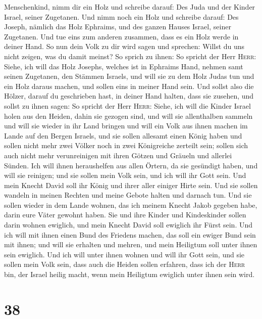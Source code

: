 Menschenkind, nimm dir ein Holz und schreibe darauf: Des Juda und der
Kinder Israel, seiner Zugetanen. Und nimm noch ein Holz und schreibe
darauf: Des Joseph, nämlich das Holz Ephraims, und des ganzen Hauses
Israel, seiner Zugetanen.  Und tue eins zum anderen
zusammen, dass es ein Holz werde in deiner Hand.  So nun
dein Volk zu dir wird sagen und sprechen: Willst du uns nicht zeigen,
was du damit meinst?  So sprich zu ihnen: So spricht der
Herr \textsc{Herr}: Siehe, ich will das Holz Josephs, welches ist in
Ephraims Hand, nehmen samt seinen Zugetanen, den Stämmen Israels, und
will sie zu dem Holz Judas tun und ein Holz daraus machen, und sollen
eins in meiner Hand sein.  Und sollst also die Hölzer,
darauf du geschrieben hast, in deiner Hand halten, dass sie zusehen,
 und sollst zu ihnen sagen: So spricht der Herr
\textsc{Herr}: Siehe, ich will die Kinder Israel holen aus den Heiden,
dahin sie gezogen sind, und will sie allenthalben sammeln und will sie
wieder in ihr Land bringen  und will ein Volk aus ihnen
machen im Lande auf den Bergen Israels, und sie sollen allesamt einen
König haben und sollen nicht mehr zwei Völker noch in zwei Königreiche
zerteilt sein;  sollen sich auch nicht mehr verunreinigen
mit ihren Götzen und Gräueln und allerlei Sünden. Ich will ihnen
heraushelfen aus allen Örtern, da sie gesündigt haben, und will sie
reinigen; und sie sollen mein Volk sein, und ich will ihr Gott sein.
 Und mein Knecht David soll ihr König und ihrer aller
einiger Hirte sein. Und sie sollen wandeln in meinen Rechten und meine
Gebote halten und darnach tun.  Und sie sollen wieder in
dem Lande wohnen, das ich meinem Knecht Jakob gegeben habe, darin eure
Väter gewohnt haben. Sie und ihre Kinder und Kindeskinder sollen darin
wohnen ewiglich, und mein Knecht David soll ewiglich ihr Fürst sein.
 Und ich will mit ihnen einen Bund des Friedens machen,
das soll ein ewiger Bund sein mit ihnen; und will sie erhalten und
mehren, und mein Heiligtum soll unter ihnen sein ewiglich.
 Und ich will unter ihnen wohnen und will ihr Gott sein,
und sie sollen mein Volk sein,  dass auch die Heiden
sollen erfahren, dass ich der \textsc{Herr} bin, der Israel heilig
macht, wenn mein Heiligtum ewiglich unter ihnen sein wird.

\hypertarget{section-37}{%
\section{38}\label{section-37}}

